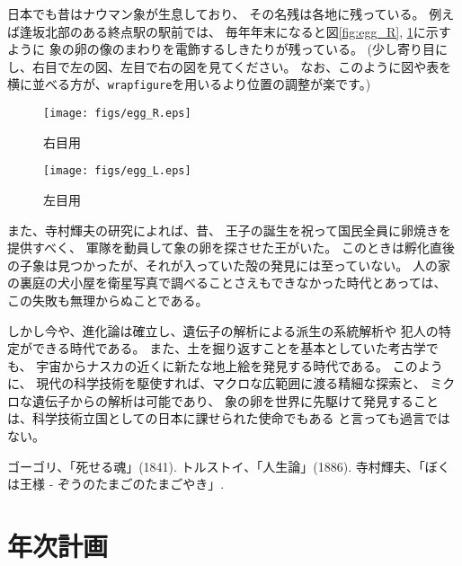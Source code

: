 \documentclass[11pt,a4paper,twoside,dvipdfmx]{jarticle}		%
\newcommand{\研究課題名}{象の卵}
\newcommand{\研究機関名}{逢坂大学}
\newcommand{\申請者氏名}{湯川秀樹}
\newcommand{\研究代表者氏名}{\申請者氏名}
\newcommand{\研究期間の最終元号年度}{34}	%
\begin{document}
{	日本でも昔はナウマン象が生息しており、
	その名残は各地に残っている。
	例えば逢坂北部のある終点駅の駅前では、
	毎年年末になると図\ref{fig:egg_R}, \ref{fig:egg_L}に示すように
	象の卵の像のまわりを電飾するしきたりが残っている。
	(少し寄り目にし、右目で左の図、左目で右の図を見てください。
	なお、このように図や表を横に並べる方が、{\tt wrapfigure}を用いるより位置の調整が楽です。)
        \begin{figure}[h]
         	\begin{minipage}[t]{0.49\linewidth}
			\texttt{[image: figs/egg\_R.eps]}
			\caption{右目用}
			\label{fig:egg_R}
		\end{minipage}
		\hspace{0.01\linewidth}
		\begin{minipage}[t]{0.49\linewidth}
			\texttt{[image: figs/egg\_L.eps]}
			\caption{左目用}
			\label{fig:egg_L}
		\end{minipage}
         \end{figure}

	また、寺村輝夫の研究\cite{teramura}によれば、昔、
	王子の誕生を祝って国民全員に卵焼きを提供すべく、
	軍隊を動員して象の卵を探させた王がいた。
	このときは孵化直後の子象は見つかったが、それが入っていた殻の発見には至っていない。
	人の家の裏庭の犬小屋を衛星写真で調べることさえもできなかった時代とあっては、
	この失敗も無理からぬことである。
	
	しかし今や、進化論は確立し、遺伝子の解析による派生の系統解析や
	犯人の特定ができる時代である。
	また、土を掘り返すことを基本としていた考古学でも、
	宇宙からナスカの近くに新たな地上絵を発見する時代である。
	このように、
	現代の科学技術を駆使すれば、マクロな広範囲に渡る精細な探索と、
	ミクロな遺伝子からの解析は可能であり、
	象の卵を世界に先駆けて発見することは、科学技術立国としての日本に課せられた使命でもある
	と言っても過言ではない。
	
	\vspace{1cm}
	\begin{thebibliography}{99}
		 ゴーゴリ、「死せる魂」(1841).
		 トルストイ、「人生論」(1886).
		 寺村輝夫、「ぼくは王様 - ぞうのたまごのたまごやき」.
	\end{thebibliography}
}

\section{年次計画}
\end{document}
